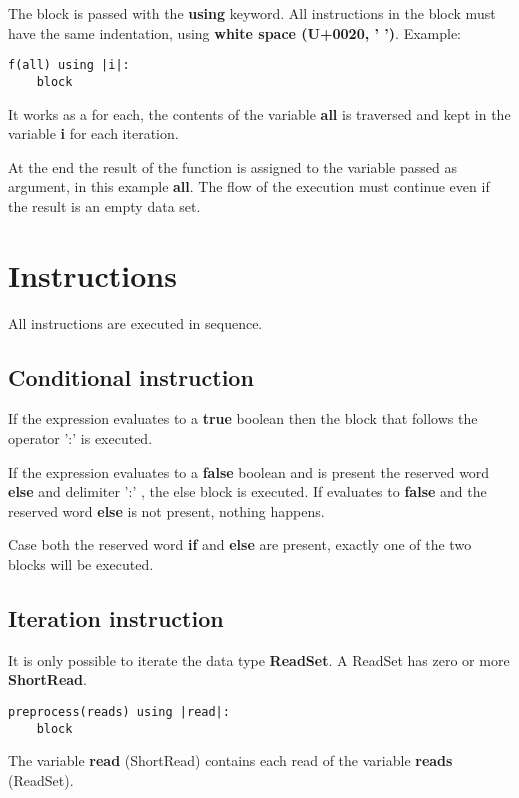 \documentclass{article}
\begin{document}
The block is passed with the \textbf{using} keyword. All instructions in the block must have the same indentation, using \textbf{white space (U+0020, ' ')}. Example:

\begin{verbatim}
f(all) using |i|:
    block
\end{verbatim}

It works as a for each, the contents of the variable \textbf{all} is traversed and kept in the variable \textbf{i} for each iteration. 

At the end the result of the function is assigned to the variable passed as argument, in this example \textbf{all}. The flow of the execution must continue even if the result is an empty data set.

\section{Instructions}

All instructions are executed in sequence.

\subsection{Conditional instruction}

If the expression evaluates to a \textbf{true} boolean then the block that follows the operator ':' is executed.

If the expression evaluates to a \textbf{false} boolean and is present the reserved word \textbf{else} and delimiter ':' , the else block is executed. If evaluates to \textbf{false} and the reserved word \textbf{else} is not present, nothing happens.

Case both the reserved word \textbf{if} and \textbf{else} are present, exactly one of the two blocks will be executed.

\subsection{Iteration instruction}
\label{sec:iter}

It is only possible to iterate the data type \textbf{ReadSet}. A ReadSet has zero or more \textbf{ShortRead}.

\begin{verbatim}
preprocess(reads) using |read|:
    block
\end{verbatim}

The variable \textbf{read} (ShortRead) contains each read of the variable \textbf{reads} (ReadSet). 
\end{document}
